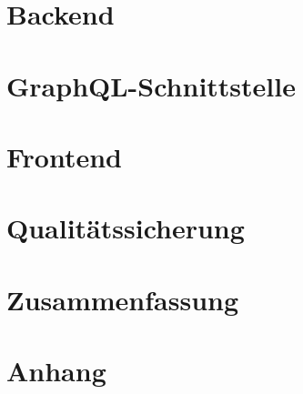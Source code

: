 \documentclass[a4paper,12pt,oneside]{article}
\begin{document}
\newpage
\section{Backend}\label{kap_Backend}


\newpage
\section{GraphQL-Schnittstelle}\label{kap_Schnittstelle}


\newpage
\section{Frontend}\label{kap_Frontend}


\newpage
\section{Qualitätssicherung }\label{kap_QS}


\newpage
\section*{Zusammenfassung }\label{kap_ZF}




\newpage
\section*{Anhang}\label{anhang}


\newpage
\printbibliography[heading=bibintoc]

\pagestyle{empty}
\end{document}

